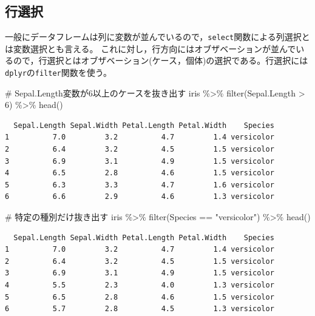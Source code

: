 \documentclass[
  a4paper,
]{ltjsbook}
\newenvironment{Shaded}{\begin{snugshade}}{\end{snugshade}}
\newcommand{\CommentTok}[1]{\textcolor[rgb]{0.37,0.37,0.37}{#1}}
\newcommand{\DecValTok}[1]{\textcolor[rgb]{0.68,0.00,0.00}{#1}}
\newcommand{\FunctionTok}[1]{\textcolor[rgb]{0.28,0.35,0.67}{#1}}
\newcommand{\NormalTok}[1]{\textcolor[rgb]{0.00,0.23,0.31}{#1}}
\newcommand{\SpecialCharTok}[1]{\textcolor[rgb]{0.37,0.37,0.37}{#1}}
\newcommand{\StringTok}[1]{\textcolor[rgb]{0.13,0.47,0.30}{#1}}
\begin{document}
\subsection{行選択}\label{ux884cux9078ux629e}

一般にデータフレームは列に変数が並んでいるので，\texttt{select}関数による列選択とは変数選択とも言える。
これに対し，行方向にはオブザベーションが並んでいるので，行選択とはオブザベーション(ケース，個体)の選択である。行選択には\texttt{dplyr}の\texttt{filter}関数を使う。

\begin{Shaded}
\begin{Highlighting}[]
\CommentTok{\# Sepal.Length変数が6以上のケースを抜き出す}
\NormalTok{iris }\SpecialCharTok{\%\textgreater{}\%}
  \FunctionTok{filter}\NormalTok{(Sepal.Length }\SpecialCharTok{\textgreater{}} \DecValTok{6}\NormalTok{) }\SpecialCharTok{\%\textgreater{}\%}
  \FunctionTok{head}\NormalTok{()}
\end{Highlighting}
\end{Shaded}

\begin{verbatim}
  Sepal.Length Sepal.Width Petal.Length Petal.Width    Species
1          7.0         3.2          4.7         1.4 versicolor
2          6.4         3.2          4.5         1.5 versicolor
3          6.9         3.1          4.9         1.5 versicolor
4          6.5         2.8          4.6         1.5 versicolor
5          6.3         3.3          4.7         1.6 versicolor
6          6.6         2.9          4.6         1.3 versicolor
\end{verbatim}

\begin{Shaded}
\begin{Highlighting}[]
\CommentTok{\# 特定の種別だけ抜き出す}
\NormalTok{iris }\SpecialCharTok{\%\textgreater{}\%}
  \FunctionTok{filter}\NormalTok{(Species }\SpecialCharTok{==} \StringTok{"versicolor"}\NormalTok{) }\SpecialCharTok{\%\textgreater{}\%}
  \FunctionTok{head}\NormalTok{()}
\end{Highlighting}
\end{Shaded}

\begin{verbatim}
  Sepal.Length Sepal.Width Petal.Length Petal.Width    Species
1          7.0         3.2          4.7         1.4 versicolor
2          6.4         3.2          4.5         1.5 versicolor
3          6.9         3.1          4.9         1.5 versicolor
4          5.5         2.3          4.0         1.3 versicolor
5          6.5         2.8          4.6         1.5 versicolor
6          5.7         2.8          4.5         1.3 versicolor
\end{verbatim}
\end{document}
